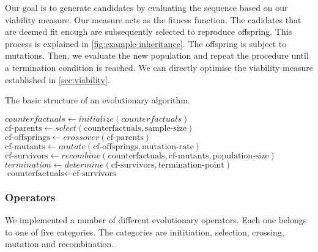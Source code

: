 \documentclass[./../../paper.tex]{subfiles}
\begin{document}
Our goal is to generate candidates by evaluating the sequence based on our viability measure. Our measure acts as the fitness function. The cadidates that are deemed fit enough are subsequently selected to reproduce offspring. This process is explained in \autoref{fig:example-inheritance}. The offspring is subject to mutations. Then, we evaluate the new population and repeat the procedure until a termination condition is reached. We can directly optimise the viability measure established in \autoref{sec:viability}.

\newcommand{\cf}{\text{counterfactuals}}
\newcommand{\cfp}{\text{cf-parents}}
\newcommand{\cfo}{\text{cf-offsprings}}
\newcommand{\cfm}{\text{cf-mutants}}
\newcommand{\cfs}{\text{cf-survivors}}


\begin{algorithm}[htb!]
    \caption{The basic structure of an evolutionary algorithm.}
    \begin{algorithmic}

        \State $counterfactuals \gets initialize(counterfactuals)$
        \State $\cfp \gets select(\cf, \text{sample-size})$
        \State $\cfo \gets crossover(\cfp) $
        \State $\cfm \gets mutate(\cfo, \text{mutation-rate})$
        \State $\cfs \gets recombine(\cf, \cfm, \text{population-size})$
        \State $termination \gets determine(\cfs, \text{termination-point})$
        \State $\cf \gets \cfs$
        \EndWhile
    \end{algorithmic}
    \label{alg:my-evolutionary}
\end{algorithm}

\subsubsection{Operators}
We implemented a number of different evolutionary operators. Each one belongs to one of five categories. The categories are inititiation, selection, crossing, mutation and recombination.
\end{document}
